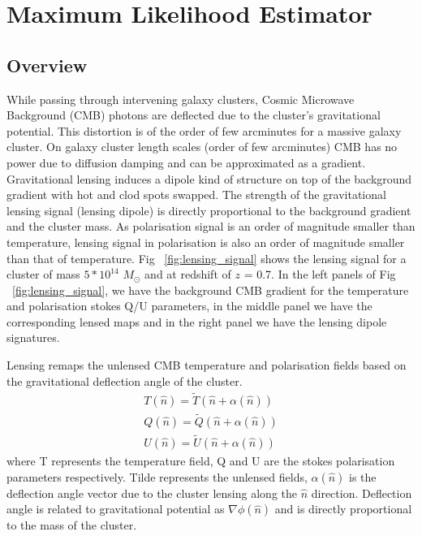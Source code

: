 \chapter{Maximum Likelihood Estimator}
\label{ch:MLE}
\section{Overview}
While passing through intervening galaxy clusters, Cosmic Microwave Background (CMB) photons are deflected due to the cluster's gravitational potential. 
This distortion is of the order of few arcminutes for a massive galaxy cluster.
On galaxy cluster length scales (order of few arcminutes) CMB has no power due to diffusion damping \citep{silk96} and can be approximated as a gradient. 
Gravitational lensing induces a dipole kind of structure on top of the background gradient with hot and clod spots swapped. 
The strength of the gravitational lensing signal (lensing dipole) is directly proportional to the background gradient and the cluster mass. 
As polarisation signal is an order of magnitude smaller than temperature, lensing signal in polarisation is also an order of magnitude smaller than that of temperature. 
Fig ~\ref{fig:lensing_signal} shows the lensing signal for a cluster of mass $5*10^{14}$ $M_{\odot}$ and at redshift of $z$ = 0.7.
In  the left panels of Fig ~\ref{fig:lensing_signal}, we have the background CMB gradient for the temperature and polarisation stokes Q/U parameters, in the middle panel we have the corresponding lensed maps and in the right panel we have the lensing dipole signatures.

Lensing remaps the unlensed CMB temperature and polarisation fields based on the gravitational deflection angle of the cluster. 
\begin{eqnarray}
T(\hat{n}) = \tilde{T}(\hat{n} + \alpha(\hat{n}))\\
Q(\hat{n}) = \tilde{Q}(\hat{n} + \alpha(\hat{n}))\\
U(\hat{n}) =  \tilde{U}(\hat{n} + \alpha(\hat{n}))
\end{eqnarray}
where T represents the temperature field, Q and U are the stokes polarisation parameters respectively. 
Tilde represents the unlensed fields, $\alpha(\hat{n})$ is the deflection angle vector due to the cluster lensing along the $\hat{n}$ direction. 
Deflection angle is related to gravitational potential as $\nabla \phi (\hat{n})$ and is directly proportional to the mass of the cluster.

